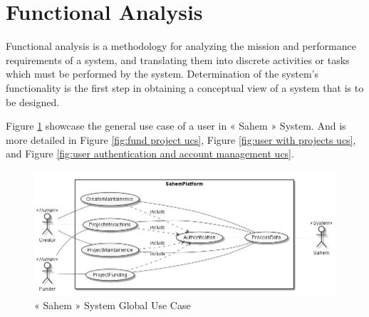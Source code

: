 \section{Functional Analysis}
Functional analysis is a methodology for analyzing the mission and performance requirements of a system, and translating them into discrete activities or tasks which must be performed by the system. Determination of the system's functionality is the first step in obtaining a conceptual view of a system that is to be designed.

Figure \ref{fig:globaluc} showcase the general use case of a user in « Sahem » System. And is more detailed in Figure \ref{fig:fund project ucs}, Figure \ref{fig:user with projects ucs}, and Figure \ref{fig:user authentication and account management ucs}. 
\begin{figure}[!ht]
      \center
      \includegraphics[scale=0.5]{assets/global.png}
      \caption{« Sahem » System Global Use Case}
      \label{fig:globaluc}
\end{figure}


% 


